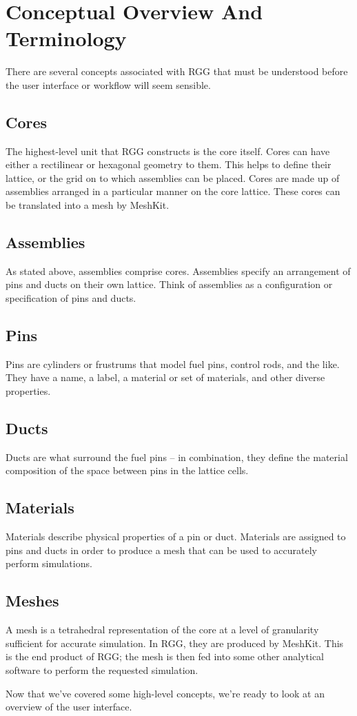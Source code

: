 \section{Conceptual Overview And Terminology}

There are several concepts associated with RGG that must be understood before the user interface or workflow will seem sensible.

\subsection{Cores}
The highest-level unit that RGG constructs is the core itself.  Cores can have either a rectilinear or hexagonal geometry to them.  This helps to define their lattice, or the grid on to which assemblies can be placed.  Cores are made up of assemblies arranged in a particular manner on the core lattice.  These cores can be translated into a mesh by MeshKit.

\subsection{Assemblies}
As stated above, assemblies comprise cores.  Assemblies specify an arrangement of pins and ducts on their own lattice.  Think of assemblies as a configuration or specification of pins and ducts.

\subsection{Pins}
Pins are cylinders or frustrums that model fuel pins, control rods, and the like.  They have a name, a label, a material or set of materials, and other diverse properties.

\subsection{Ducts}
Ducts are what surround the fuel pins -- in combination, they define the material composition of the space between pins in the lattice cells.

\subsection{Materials}
Materials describe physical properties of a pin or duct.  Materials are assigned to pins and ducts in order to produce a mesh that can be used to accurately perform simulations.

\subsection{Meshes}
A mesh is a tetrahedral representation of the core at a level of granularity sufficient for accurate simulation.  In RGG, they are produced by MeshKit.  This is the end product of RGG; the mesh is then fed into some other analytical software to perform the requested simulation.

Now that we've covered some high-level concepts, we're ready to look at an overview of the user interface.